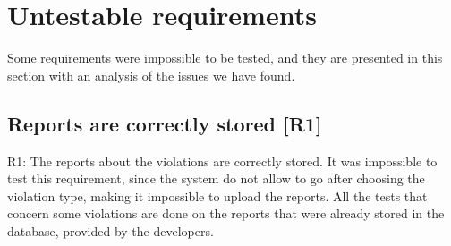 \documentclass[../ATD.tex]{subfiles}
\begin{document}
    \section{Untestable requirements}\label{sec:untestable-requirements}
    Some requirements were impossible to be tested, and they are presented in this section with an analysis of the issues we have found.

    \subsection{Reports are correctly stored [R1]}\label{subsec:report-are-correctly-stored}
    R1: The reports about the violations are correctly stored.
    \newline
    It was impossible to test this requirement, since the system do not allow to go after choosing the violation type, making it impossible to upload the reports.
    All the tests that concern some violations are done on the reports that were already stored in the database, provided by the developers.
\end{document}
